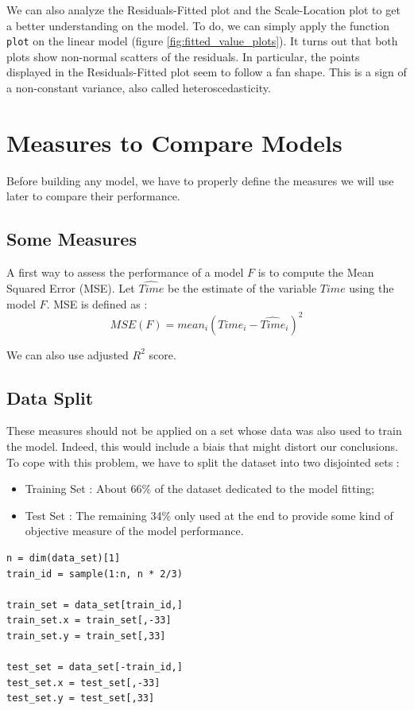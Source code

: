 \documentclass[]{report}
\begin{document}
We can also analyze the Residuals-Fitted plot and the Scale-Location plot to get a better understanding on the model. To do, we can simply apply the function \texttt{plot} on the linear model (figure \ref{fig:fitted_value_plots}). It turns out that both plots show non-normal scatters of the residuals. In particular, the points displayed in the Residuals-Fitted plot seem to follow a fan shape. This is a sign of a non-constant variance, also called heteroscedasticity.

\section{Measures to Compare Models}
Before building any model, we have to properly define the measures we will use later to compare their performance. 

\subsection{Some Measures}
A first way to assess the performance of a model $F$ is to compute the Mean Squared Error (MSE). Let $\hat{Time}$ be the estimate of the variable $Time$ using the model $F$. MSE is defined as :
$$MSE(F) =  mean_i(Time_i - \hat{Time}_i)^2$$

We can also use adjusted $R^2$ score.

\subsection{Data Split}
These measures should not be applied on a set whose data was also used to train the model. Indeed, this would include a biais that might distort our conclusions. To cope with this problem, we have to split the dataset into two disjointed sets : 
\begin{itemize}
	\item Training Set : About 66\% of the dataset dedicated to the model fitting;
	\item Test Set : The remaining 34\% only used at the end to provide some kind of objective measure of the model performance.
\end{itemize} 

\begin{lstlisting}
n = dim(data_set)[1]
train_id = sample(1:n, n * 2/3)

train_set = data_set[train_id,]
train_set.x = train_set[,-33]
train_set.y = train_set[,33]

test_set = data_set[-train_id,]
test_set.x = test_set[,-33]
test_set.y = test_set[,33]
\end{lstlisting}
\end{document}

